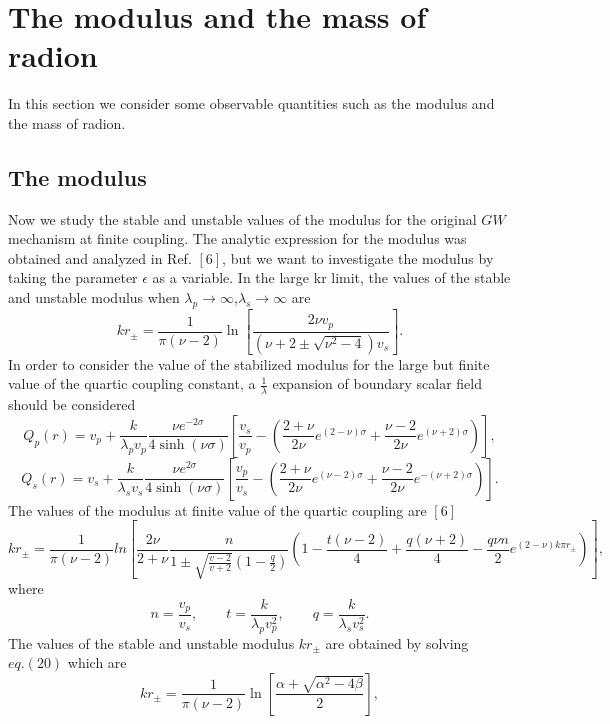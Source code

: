 \documentclass[12pt]{article}
\begin{document}
\section{The modulus and the mass of radion}
In this section we consider some observable quantities such as the
modulus and the mass of radion.


\subsection{ The modulus}
Now we study the stable and unstable values of the modulus for the original $GW$ mechanism at finite coupling. The analytic expression for the modulus was obtained and analyzed in Ref. $[6]$, but we want to investigate the modulus by taking the parameter $\epsilon$ as a variable. In the large kr limit, the values of the stable and unstable modulus when
$\lambda_p\rightarrow\infty$,$\lambda_s\rightarrow\infty$ are
\begin{equation}
kr_{\pm}=\frac{1}{\pi(\nu-2)}\ln[ \frac{2\nu
v_p}{(\nu+2\pm\sqrt{\nu^2-4})v_s}].
\end{equation}
In order to consider the value of the stabilized modulus for the
large but finite value of the quartic coupling constant, a $\frac{1}{\lambda}$ expansion of boundary scalar field should be considered
\begin{equation}
Q_p(r)=v_p+\frac{k}{\lambda_p v_p}\frac{\nu e^{-2\sigma}}{4\sinh(\nu
\sigma)}[\frac{v_s}{v_p}-(\frac{2+\nu}{2\nu}e^{(2-\nu)\sigma} +
\frac{\nu-2}{2\nu}e^{(\nu+2)\sigma})],
\end{equation}
\begin{equation}
Q_s(r)=v_s+\frac{k}{\lambda_s v_s}\frac{\nu e^{2\sigma}}{4\sinh(\nu
\sigma)}[\frac{v_p}{v_s}-(\frac{2+\nu}{2\nu}e^{(\nu-2)\sigma} +
\frac{\nu-2}{2\nu}e^{-(\nu+2)\sigma})].
\end{equation}
The values of the modulus at finite value of the quartic coupling are $[6]$
\begin{equation}
kr_{\pm}=\frac{1}{\pi(\nu-2)}ln[\frac{2\nu}{2+\nu}\frac{n}{1\pm
\sqrt{\frac{v-2}{v+2}}(1-\frac{q}{2})}
(1-\frac{t(\nu-2)}{4}+\frac{q(\nu+2)}{4}-\frac{q\nu n}{2}
e^{(2-\nu)k \pi r_{\pm}})],
\end{equation}
where
\begin{equation}
 n=\frac{v_p}{v_s},\qquad t=\frac{k}{\lambda_pv^2_p},\qquad
q=\frac{k}{\lambda_sv^2_s}.
\end{equation}
The values of the stable and unstable modulus $kr_{\pm}$ are obtained by solving
$eq.(20)$ which are
\begin{equation}
kr_{\pm}=\frac{1}{\pi(\nu-2)}\ln[\frac{\alpha+\sqrt{\alpha^2-4\beta}}{2}],
\end{equation}
\end{document}
